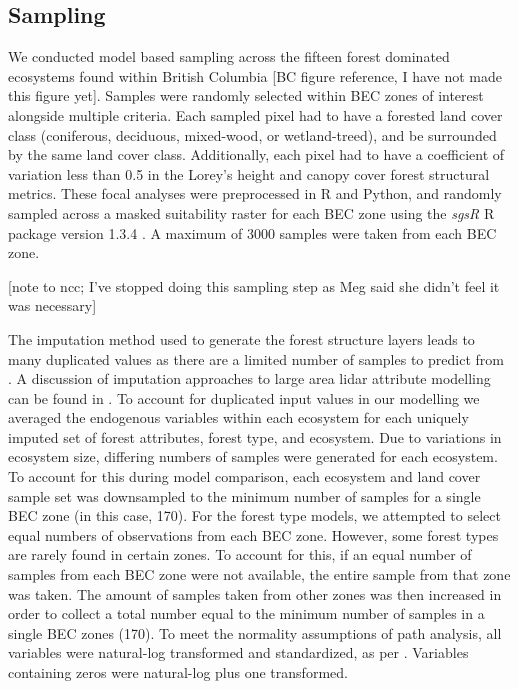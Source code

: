 \documentclass[
  authoryear,
  review,
  3p,
  twocolumn]{elsarticle}
\begin{document}
\hypertarget{sampling}{%
\subsection{Sampling}\label{sampling}}

We conducted model based sampling across the fifteen forest dominated
ecosystems found within British Columbia {[}BC figure reference, I have
not made this figure yet{]}. Samples were randomly selected within BEC
zones of interest alongside multiple criteria. Each sampled pixel had to
have a forested land cover class (coniferous, deciduous, mixed-wood, or
wetland-treed), and be surrounded by the same land cover class.
Additionally, each pixel had to have a coefficient of variation less
than 0.5 in the Lorey's height and canopy cover forest structural
metrics. These focal analyses were preprocessed in R and Python, and
randomly sampled across a masked suitability raster for each BEC zone
using the \emph{sgsR} R package version 1.3.4 \citep{goodbody2023}. A
maximum of 3000 samples were taken from each BEC zone.

{[}note to ncc; I've stopped doing this sampling step as Meg said she
didn't feel it was necessary{]}

The imputation method used to generate the forest structure layers leads
to many duplicated values as there are a limited number of samples to
predict from \citep{matasci2018}. A discussion of imputation approaches
to large area lidar attribute modelling can be found in
\citet{coops2021}. To account for duplicated input values in our
modelling we averaged the endogenous variables within each ecosystem for
each uniquely imputed set of forest attributes, forest type, and
ecosystem. Due to variations in ecosystem size, differing numbers of
samples were generated for each ecosystem. To account for this during
model comparison, each ecosystem and land cover sample set was
downsampled to the minimum number of samples for a single BEC zone (in
this case, 170). For the forest type models, we attempted to select
equal numbers of observations from each BEC zone. However, some forest
types are rarely found in certain zones. To account for this, if an
equal number of samples from each BEC zone were not available, the
entire sample from that zone was taken. The amount of samples taken from
other zones was then increased in order to collect a total number equal
to the minimum number of samples in a single BEC zones (170). To meet
the normality assumptions of path analysis, all variables were
natural-log transformed and standardized, as per \citet{grace2016}.
Variables containing zeros were natural-log plus one transformed.
\end{document}
